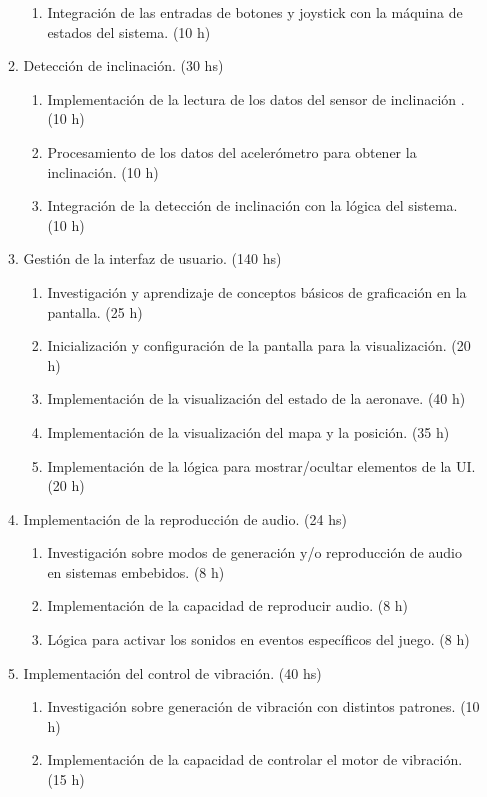 \documentclass[
11pt, %
]{charter}
\begin{document}
\begin{enumerate}
\begin{enumerate}
\begin{enumerate}
			\item Integración de las entradas de botones y joystick con la máquina de estados del sistema. (10 h)
        \end{enumerate}
		\item Detección de inclinación. (30 hs)
        \begin{enumerate}
			\item Implementación de la lectura de los datos del sensor de inclinación . (10 h)
			\item Procesamiento de los datos del acelerómetro para obtener la inclinación. (10 h)
			\item Integración de la detección de inclinación con la lógica del sistema. (10 h)
        \end{enumerate}
		\item Gestión de la interfaz de usuario. (140 hs)
        \begin{enumerate}
			\item Investigación y aprendizaje de conceptos básicos de graficación en la pantalla. (25 h)
			\item Inicialización y configuración de la pantalla para la visualización. (20 h)
			\item Implementación de la visualización del estado de la aeronave. (40 h)
			\item Implementación de la visualización del mapa y la posición. (35 h)
			\item Implementación de la lógica para mostrar/ocultar elementos de la UI. (20 h)
        \end{enumerate}
		\item Implementación de la reproducción de audio. (24 hs)
        \begin{enumerate}
			\item Investigación sobre modos de generación y/o reproducción de audio en sistemas embebidos. (8 h)
			\item Implementación de la capacidad de reproducir audio. (8 h)
			\item Lógica para activar los sonidos en eventos específicos del juego. (8 h)
        \end{enumerate}
		\item Implementación del control de vibración. (40 hs)
        \begin{enumerate}
			\item Investigación sobre generación de vibración con distintos patrones. (10 h)
			\item Implementación de la capacidad de controlar el motor de vibración. (15 h)

\end{enumerate}
\end{enumerate}
\end{enumerate}
\end{document}
